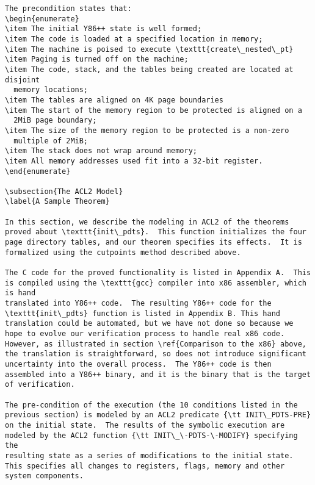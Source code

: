 \documentclass[submission,copyright]{eptcs} \providecommand{\event}{ACL2 2011}
\begin{document}
\begin{verbatim}
The precondition states that:
\begin{enumerate}
\item The initial Y86++ state is well formed;
\item The code is loaded at a specified location in memory;
\item The machine is poised to execute \texttt{create\_nested\_pt}
\item Paging is turned off on the machine;
\item The code, stack, and the tables being created are located at disjoint
  memory locations;
\item The tables are aligned on 4K page boundaries
\item The start of the memory region to be protected is aligned on a
  2MiB page boundary;
\item The size of the memory region to be protected is a non-zero
  multiple of 2MiB;
\item The stack does not wrap around memory;
\item All memory addresses used fit into a 32-bit register.
\end{enumerate}

\subsection{The ACL2 Model}
\label{A Sample Theorem}

In this section, we describe the modeling in ACL2 of the theorems
proved about \texttt{init\_pdts}.  This function initializes the four
page directory tables, and our theorem specifies its effects.  It is
formalized using the cutpoints method described above.

The C code for the proved functionality is listed in Appendix A.  This
is compiled using the \texttt{gcc} compiler into x86 assembler, which is hand
translated into Y86++ code.  The resulting Y86++ code for the
\texttt{init\_pdts} function is listed in Appendix B. This hand
translation could be automated, but we have not done so because we
hope to evolve our verification process to handle real x86 code.
However, as illustrated in section \ref{Comparison to the x86} above,
the translation is straightforward, so does not introduce significant
uncertainty into the overall process.  The Y86++ code is then
assembled into a Y86++ binary, and it is the binary that is the target
of verification.

The pre-condition of the execution (the 10 conditions listed in the
previous section) is modeled by an ACL2 predicate {\tt INIT\_PDTS-PRE}
on the initial state.  The results of the symbolic execution are
modeled by the ACL2 function {\tt INIT\_\-PDTS-\-MODIFY} specifying the
resulting state as a series of modifications to the initial state.
This specifies all changes to registers, flags, memory and other
system components.


\end{verbatim}
\end{document}
